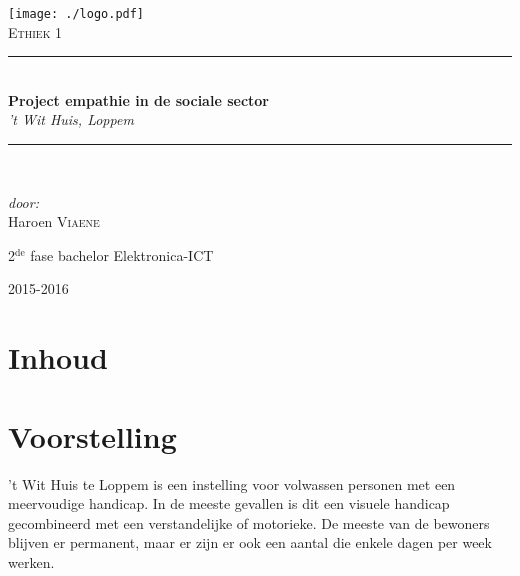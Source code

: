 \documentclass[a4paper,12pt]{article}
\newcommand{\HRule}{\rule{\linewidth}{0.5mm}}
\begin{document}
\begin{titlepage}
\begin{center}
\texttt{[image: ./logo.pdf]}~\\[1cm]


\textsc{\Large Ethiek 1}\\[0.5cm]

\HRule \\[0.4cm]
{ \LARGE \bfseries Project empathie in de sociale sector}\\[0.4cm]
{\large \textit{'t Wit Huis, Loppem}}\\[0.2cm]

\HRule \\[1.5cm]

\begin{minipage}{0.4\textwidth}
\begin{flushleft} \large
\emph{door:}\\
Haroen \textsc{Viaene}\\

\end{flushleft}
\end{minipage}
\begin{minipage}{0.4\textwidth}
\begin{flushright} \large
\large{2$^{\text{de}}$ fase bachelor Elektronica-ICT}\\
\end{flushright}
\end{minipage}

\vfill

{\large 2015-2016}

\end{center}
\end{titlepage}

\newpage

\section*{Inhoud}

\tableofcontents

\newpage

\section{Voorstelling}


't Wit Huis te Loppem is een instelling voor volwassen personen met een meervoudige handicap. In de meeste gevallen is dit een visuele handicap gecombineerd met een verstandelijke of motorieke. De meeste van de bewoners blijven er permanent, maar er zijn er ook een aantal die enkele dagen per week werken.
\end{document}
